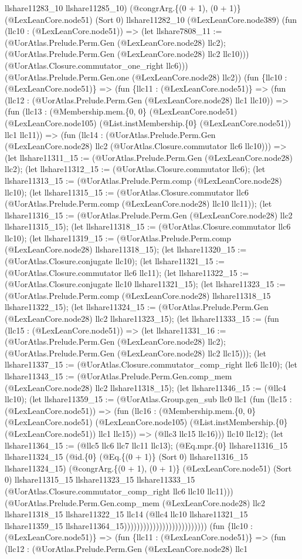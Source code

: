 \documentclass[11pt]{article}
\begin{document}
llshare11283\_10 llshare11285\_10) (@congrArg.\{(0 + 1), (0 + 1)\} (@LexLeanCore.node51) (Sort 0) llshare11282\_10 (@LexLeanCore.node389) (fun (llc10 : (@LexLeanCore.node51)) => (let llshare7808\_11 := (@UorAtlas.Prelude.Perm.Gen (@LexLeanCore.node28) llc2); (@UorAtlas.Prelude.Perm.Gen (@LexLeanCore.node28) llc2 llc10))) (@UorAtlas.Closure.commutator\_one\_right llc6))) (@UorAtlas.Prelude.Perm.Gen.one (@LexLeanCore.node28) llc2)) (fun \{llc10 : (@LexLeanCore.node51)\} => (fun \{llc11 : (@LexLeanCore.node51)\} => (fun (llc12 : (@UorAtlas.Prelude.Perm.Gen (@LexLeanCore.node28) llc1 llc10)) => (fun (llc13 : (@Membership.mem.\{0, 0\} (@LexLeanCore.node51) (@LexLeanCore.node105) (@List.instMembership.\{0\} (@LexLeanCore.node51)) llc1 llc11)) => (fun (llc14 : (@UorAtlas.Prelude.Perm.Gen (@LexLeanCore.node28) llc2 (@UorAtlas.Closure.commutator llc6 llc10))) => (let llshare11311\_15 := (@UorAtlas.Prelude.Perm.Gen (@LexLeanCore.node28) llc2); (let llshare11312\_15 := (@UorAtlas.Closure.commutator llc6); (let llshare11313\_15 := (@UorAtlas.Prelude.Perm.comp (@LexLeanCore.node28) llc10); (let llshare11315\_15 := (@UorAtlas.Closure.commutator llc6 (@UorAtlas.Prelude.Perm.comp (@LexLeanCore.node28) llc10 llc11)); (let llshare11316\_15 := (@UorAtlas.Prelude.Perm.Gen (@LexLeanCore.node28) llc2 llshare11315\_15); (let llshare11318\_15 := (@UorAtlas.Closure.commutator llc6 llc10); (let llshare11319\_15 := (@UorAtlas.Prelude.Perm.comp (@LexLeanCore.node28) llshare11318\_15); (let llshare11320\_15 := (@UorAtlas.Closure.conjugate llc10); (let llshare11321\_15 := (@UorAtlas.Closure.commutator llc6 llc11); (let llshare11322\_15 := (@UorAtlas.Closure.conjugate llc10 llshare11321\_15); (let llshare11323\_15 := (@UorAtlas.Prelude.Perm.comp (@LexLeanCore.node28) llshare11318\_15 llshare11322\_15); (let llshare11324\_15 := (@UorAtlas.Prelude.Perm.Gen (@LexLeanCore.node28) llc2 llshare11323\_15); (let llshare11333\_15 := (fun (llc15 : (@LexLeanCore.node51)) => (let llshare11331\_16 := (@UorAtlas.Prelude.Perm.Gen (@LexLeanCore.node28) llc2); (@UorAtlas.Prelude.Perm.Gen (@LexLeanCore.node28) llc2 llc15))); (let llshare11337\_15 := (@UorAtlas.Closure.commutator\_comp\_right llc6 llc10); (let llshare11343\_15 := (@UorAtlas.Prelude.Perm.Gen.comp\_mem (@LexLeanCore.node28) llc2 llshare11318\_15); (let llshare11346\_15 := (@llc4 llc10); (let llshare11359\_15 := (@UorAtlas.Group.gen\_sub llc0 llc1 (fun (llc15 : (@LexLeanCore.node51)) => (fun (llc16 : (@Membership.mem.\{0, 0\} (@LexLeanCore.node51) (@LexLeanCore.node105) (@List.instMembership.\{0\} (@LexLeanCore.node51)) llc1 llc15)) => (@llc3 llc15 llc16))) llc10 llc12); (let llshare11364\_15 := (@llc5 llc6 llc7 llc11 llc13); (@Eq.mpr.\{0\} llshare11316\_15 llshare11324\_15 (@id.\{0\} (@Eq.\{(0 + 1)\} (Sort 0) llshare11316\_15 llshare11324\_15) (@congrArg.\{(0 + 1), (0 + 1)\} (@LexLeanCore.node51) (Sort 0) llshare11315\_15 llshare11323\_15 llshare11333\_15 (@UorAtlas.Closure.commutator\_comp\_right llc6 llc10 llc11))) (@UorAtlas.Prelude.Perm.Gen.comp\_mem (@LexLeanCore.node28) llc2 llshare11318\_15 llshare11322\_15 llc14 (@llc4 llc10 llshare11321\_15 llshare11359\_15 llshare11364\_15)))))))))))))))))))))))))) (fun \{llc10 : (@LexLeanCore.node51)\} => (fun \{llc11 : (@LexLeanCore.node51)\} => (fun (llc12 : (@UorAtlas.Prelude.Perm.Gen (@LexLeanCore.node28) llc1 
\end{document}
